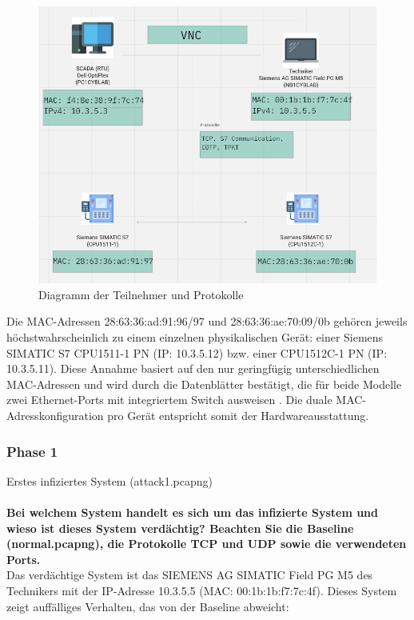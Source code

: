 \documentclass[
    a4paper,
    pagesize,
	pdftex,
    12pt,
]{scrartcl}
\begin{document}
\begin{figure}[H]
	\centering
	\includegraphics[width=\textwidth]{diagramm-teilnehmer.png}
	\caption{Diagramm der Teilnehmer und Protokolle}
	\label{fig:diagramm-teilnehmer}
\end{figure}

Die MAC-Adressen 28:63:36:ad:91:96/97 und 28:63:36:ae:70:09/0b gehören jeweils höchstwahrscheinlich zu einem einzelnen physikalischen Gerät: einer Siemens SIMATIC S7 CPU1511-1 PN (IP: 10.3.5.12) bzw. einer CPU1512C-1 PN (IP: 10.3.5.11). Diese Annahme basiert auf den nur geringfügig unterschiedlichen MAC-Adressen und wird durch die Datenblätter bestätigt, die für beide Modelle zwei Ethernet-Ports mit integriertem Switch ausweisen \cite{siemens-s7-cpu-1511-1-PN, siemens-s7-cpu-1512C-1-PN}. Die duale MAC-Adresskonfiguration pro Gerät entspricht somit der Hardwareausstattung.

\subsubsection{Phase 1}
Erstes infiziertes System (attack1.pcapng)
\\ \\
\textbf{Bei welchem System handelt es sich um das infizierte System und wieso ist dieses System verdächtig? Beachten Sie die Baseline (normal.pcapng), die Protokolle TCP und UDP sowie die verwendeten Ports.}
\\ 
Das verdächtige System ist das SIEMENS AG SIMATIC Field PG M5 des Technikers mit der IP-Adresse 10.3.5.5 (MAC: 00:1b:1b:f7:7c:4f). Dieses System zeigt auffälliges Verhalten, das von der Baseline abweicht:
\end{document}
